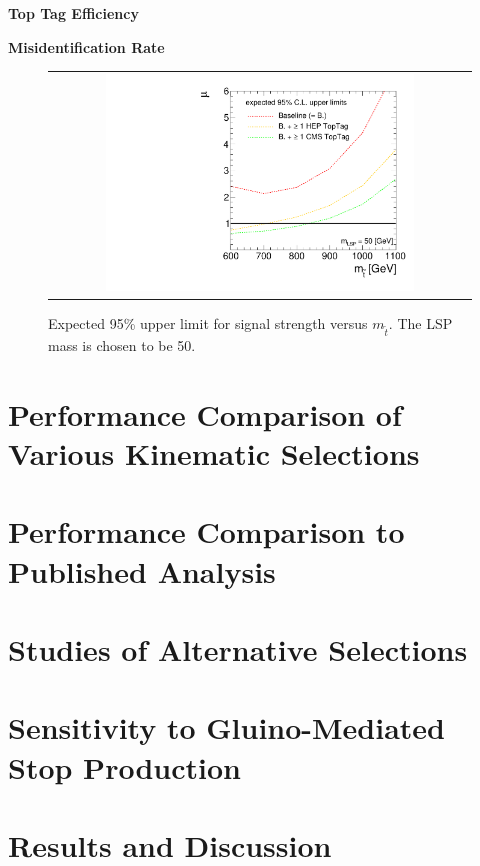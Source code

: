\begin{description}
 \item \textbf{Top Tag Efficiency}
 \item \textbf{Misidentification Rate}
\end{description}

\begin{figure}[!h]
  \centering
  \begin{tabular}{c}
                \includegraphics[width=0.75\textwidth]{figures/limitplot4BinSel_BaselineTopTag.pdf} 
  \end{tabular}
  \caption{Expected 95\% upper limit for signal strength versus $m_{\tilde{t}}$. The LSP mass is chosen to be 50\gev.}
  \label{fig:stop_baselinetoptag_limit}
\end{figure}

\section{Performance Comparison of Various Kinematic Selections}
\label{sec:stop_cuts}

\section{Performance Comparison to Published Analysis}
\label{sec:stop_pub}

\section{Studies of Alternative Selections}
\label{sec:stop_alternatives}

\section{Sensitivity to Gluino-Mediated Stop Production}
\label{sec:stop_gluinos}

\section{Results and Discussion}
\label{sec:stop_results}


